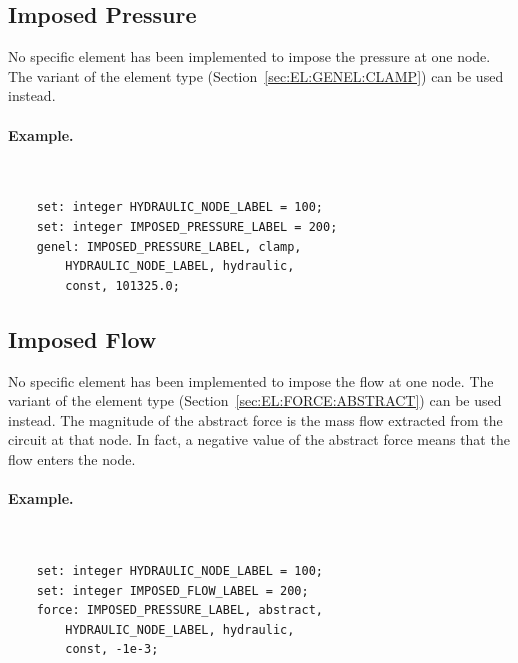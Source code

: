\subsection{Imposed Pressure}
\label{sec:EL:HYDR:IMPOSED_PRESSURE}
No specific element has been implemented to impose the pressure at one node.
The  variant of the  element type
(Section~\ref{sec:EL:GENEL:CLAMP}) can be used instead.

\paragraph{Example.} \
\begin{verbatim}
    set: integer HYDRAULIC_NODE_LABEL = 100;
    set: integer IMPOSED_PRESSURE_LABEL = 200;
    genel: IMPOSED_PRESSURE_LABEL, clamp,
        HYDRAULIC_NODE_LABEL, hydraulic,
        const, 101325.0;
\end{verbatim}


\subsection{Imposed Flow}
\label{sec:EL:HYDR:IMPOSED_FLOW}
No specific element has been implemented to impose the flow at one node.
The \kw{abstract} variant of the \kw{force} element type
(Section~\ref{sec:EL:FORCE:ABSTRACT}) can be used instead.
The magnitude of the abstract force is the mass flow extracted
from the circuit at that node.
In fact, a negative value of the abstract force means that the flow enters
the node.

\paragraph{Example.} \
\begin{verbatim}
    set: integer HYDRAULIC_NODE_LABEL = 100;
    set: integer IMPOSED_FLOW_LABEL = 200;
    force: IMPOSED_PRESSURE_LABEL, abstract,
        HYDRAULIC_NODE_LABEL, hydraulic,
        const, -1e-3;
\end{verbatim}





